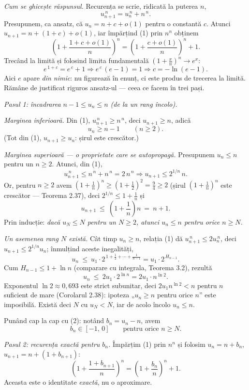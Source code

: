 \emph{Cum se ghicește răspunsul.} Recurența se scrie, ridicată la puterea $n$,
\[ u_{n+1}^{\,n}=u_{n}^{\,n}+n^{\,n} . \tag{1} \]
Presupunem, ca ansatz, că $u_{n}=n+c+o(1)$ pentru o constantă $c$. Atunci $u_{n+1}=n+(1+c)+o(1)$, iar împărțind (1) prin $n^{n}$ obținem
\[ \left(1+\frac{1+c+o(1)}{n}\right)^{\!n}=\left(1+\frac{c+o(1)}{n}\right)^{\!n}+1 . \]
Trecând la limită și folosind limita fundamentală $\left(1+\frac xn\right)^{n}\to e^{x}$:
\[ e^{\,1+c}=e^{\,c}+1 \Longrightarrow e^{\,c}\,(e-1)=1 \Longrightarrow c=-\ln(e-1) . \]
Aici $e$ apare \emph{din nimic}: nu figurează în enunț, ci este produs de trecerea la limită. Rămâne de justificat riguros ansatz-ul --- ceea ce facem în trei pași.

\emph{Pasul 1: încadrarea $n-1\le u_{n}\le n$ (de la un rang încolo).}

\emph{Marginea inferioară.} Din (1), $u_{n+1}^{\,n}\ge n^{\,n}$, deci $u_{n+1}\ge n$, adică
\[ u_{n}\ge n-1\qquad(n\ge2) . \tag{2} \]
(Tot din (1), $u_{n+1}\ge u_{n}$: șirul este crescător.)

\emph{Marginea superioară --- o proprietate care se autopropagă.} Presupunem $u_{n}\le n$ pentru un $n\ge2$. Atunci, din (1),
\[ u_{n+1}^{\,n}\le n^{\,n}+n^{\,n}=2\,n^{\,n} \Longrightarrow u_{n+1}\le 2^{1/n}\,n . \]
Or, pentru $n\ge2$ avem $\left(1+\frac1n\right)^{n}\ge\left(1+\frac12\right)^{2}=\frac94\ge2$ (șirul $\left(1+\frac1n\right)^{n}$ este crescător --- Teorema 2.37), deci $2^{1/n}\le1+\frac1n$ și
\[ u_{n+1}\ \le\ \left(1+\frac1n\right)n\ =\ n+1 . \]
Prin inducție: \emph{dacă $u_{N}\le N$ pentru un $N\ge2$, atunci $u_{n}\le n$ pentru orice $n\ge N$.}

\emph{Un asemenea rang $N$ există.} Cât timp $u_{n}\ge n$, relația (1) dă $u_{n+1}^{\,n}\le2u_{n}^{\,n}$, deci $u_{n+1}\le2^{1/n}u_{n}$; înmulțind aceste inegalități,
\[ u_{n}\ \le\ u_{1}\cdot2^{\,1+\frac12+\cdots+\frac{1}{n-1}}=u_{1}\cdot2^{\,H_{n-1}} . \]
Cum $H_{n-1}\le1+\ln n$ (comparare cu integrala, Teorema 3.2), rezultă
\[ u_{n}\ \le\ 2u_{1}\cdot2^{\ln n}=2u_{1}\cdot n^{\ln 2} . \]
Exponentul $\ln2\approx0{,}693$ este strict subunitar, deci $2u_{1}n^{\ln2}<n$ pentru $n$ suficient de mare (Corolarul 2.38): ipoteza „$u_{n}\ge n$ pentru orice $n$'' este imposibilă. Există deci $N$ cu $u_{N}<N$, iar de acolo încolo $u_{n}\le n$.

Punând cap la cap cu (2): notând $b_{n}=u_{n}-n$, avem
\[ b_{n}\in[-1,\,0]\qquad\text{pentru orice }n\ge N . \tag{3} \]

\emph{Pasul 2: recurența exactă pentru $b_{n}$.} Împărțim (1) prin $n^{n}$ și folosim $u_{n}=n+b_{n}$, $u_{n+1}=n+(1+b_{n+1})$:
\[ \left(1+\frac{1+b_{n+1}}{n}\right)^{\!n}=\left(1+\frac{b_{n}}{n}\right)^{\!n}+1 . \tag{4} \]
Aceasta este o identitate \emph{exactă}, nu o aproximare.

